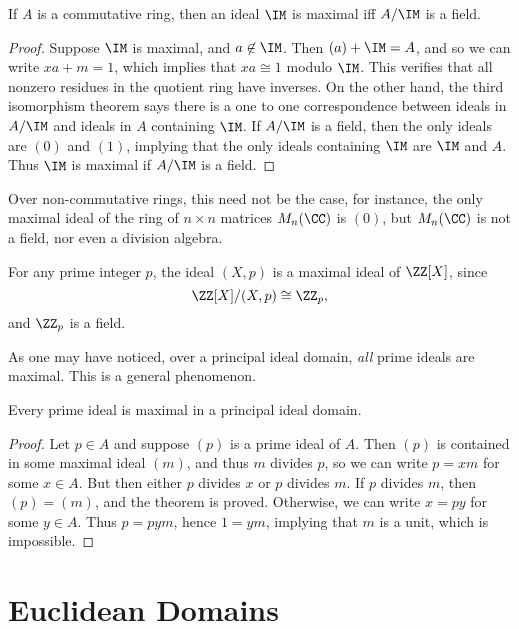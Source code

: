\begin{theorem}
    If $A$ is a commutative ring, then an ideal $\IM$ is maximal iff $A/\IM$ is a field.
\end{theorem}
\begin{proof}
    Suppose $\IM$ is maximal, and $a \not \in \IM$. Then $(a) + \IM = A$, and so we can write $xa + m = 1$, which implies that $xa \cong 1$ modulo $\IM$. This verifies that all nonzero residues in the quotient ring have inverses. On the other hand, the third isomorphism theorem says there is a one to one correspondence between ideals in $A/\IM$ and ideals in $A$ containing $\IM$. If $A/\IM$ is a field, then the only ideals are $(0)$ and $(1)$, implying that the only ideals containing $\IM$ are $\IM$ and $A$. Thus $\IM$ is maximal if $A/\IM$ is a field.
\end{proof}

Over non-commutative rings, this need not be the case, for instance, the only maximal ideal of the ring of $n \times n$ matrices $M_n(\CC)$ is $(0)$, but $M_n(\CC)$ is not a field, nor even a division algebra.

\begin{example}
    For any prime integer $p$, the ideal $(X,p)$ is a maximal ideal of $\ZZ[X]$, since
    \[ \ZZ[X]/(X,p) \cong \ZZ_p, \]
    and $\ZZ_p$ is a field.
\end{example}

As one may have noticed, over a principal ideal domain, \emph{all} prime ideals are maximal. This is a general phenomenon.

\begin{theorem}
    Every prime ideal is maximal in a principal ideal domain.
\end{theorem}
\begin{proof}
    Let $p \in A$ and suppose $(p)$ is a prime ideal of $A$. Then $(p)$ is contained in some maximal ideal $(m)$, and thus $m$ divides $p$, so we can write $p = xm$ for some $x \in A$. But then either $p$ divides $x$ or $p$ divides $m$. If $p$ divides $m$, then $(p) = (m)$, and the theorem is proved. Otherwise, we can write $x = py$ for some $y \in A$. Thus $p = pym$, hence $1 = ym$, implying that $m$ is a unit, which is impossible.
\end{proof}

\section{Euclidean Domains}

